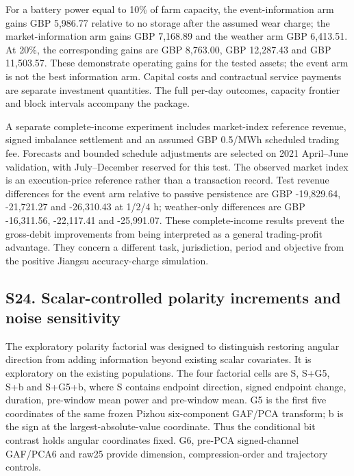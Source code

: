\documentclass[a4paper,11pt]{article}
\begin{document}
For a battery power equal to 10\% of farm capacity, the event-information arm gains GBP 5,986.77 relative to no storage after the assumed wear charge; the market-information arm gains GBP 7,168.89 and the weather arm GBP 6,413.51. At 20\%, the corresponding gains are GBP 8,763.00, GBP 12,287.43 and GBP 11,503.57. These demonstrate operating gains for the tested assets; the event arm is not the best information arm. Capital costs and contractual service payments are separate investment quantities. The full per-day outcomes, capacity frontier and block intervals accompany the package.

A separate complete-income experiment includes market-index reference revenue, signed imbalance settlement and an assumed GBP 0.5/MWh scheduled trading fee. Forecasts and bounded schedule adjustments are selected on 2021 April--June validation, with July--December reserved for this test. The observed market index is an execution-price reference rather than a transaction record. Test revenue differences for the event arm relative to passive persistence are GBP -19,829.64, -21,721.27 and -26,310.43 at 1/2/4 h; weather-only differences are GBP -16,311.56, -22,117.41 and -25,991.07. These complete-income results prevent the gross-debit improvements from being interpreted as a general trading-profit advantage. They concern a different task, jurisdiction, period and objective from the positive Jiangsu accuracy-charge simulation.

\subsection{S24. Scalar-controlled polarity increments and noise sensitivity}\label{s24.-scalar-controlled-polarity-increments-and-noise-sensitivity}

The exploratory polarity factorial was designed to distinguish restoring angular direction from adding information beyond existing scalar covariates. It is exploratory on the existing populations. The four factorial cells are S, S+G5, S+b and S+G5+b, where S contains endpoint direction, signed endpoint change, duration, pre-window mean power and pre-window mean. G5 is the first five coordinates of the same frozen Pizhou six-component GAF/PCA transform; b is the sign at the largest-absolute-value coordinate. Thus the conditional bit contrast holds angular coordinates fixed. G6, pre-PCA signed-channel GAF/PCA6 and raw25 provide dimension, compression-order and trajectory controls.
\end{document}
